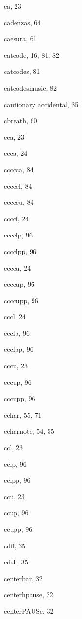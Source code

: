\begin{theindex}
  \item {\Bslash ca}, 23
  \item cadenzas, 64
  \item {\Bslash caesura}, 61
  \item {\Bslash catcode}, 16, 81, 82
  \item {\Bslash catcodes}, 81
  \item {\Bslash catcodesmusic}, 82
  \item cautionary accidental, 35
  \item {\Bslash cbreath}, 60
  \item {\Bslash cca}, 23
  \item {\Bslash ccca}, 24
  \item {\Bslash ccccca}, 84
  \item {\Bslash cccccl}, 84
  \item {\Bslash cccccu}, 84
  \item {\Bslash ccccl}, 24
  \item {\Bslash cccclp}, 96
  \item {\Bslash cccclpp}, 96
  \item {\Bslash ccccu}, 24
  \item {\Bslash ccccup}, 96
  \item {\Bslash ccccupp}, 96
  \item {\Bslash cccl}, 24
  \item {\Bslash ccclp}, 96
  \item {\Bslash ccclpp}, 96
  \item {\Bslash cccu}, 23
  \item {\Bslash cccup}, 96
  \item {\Bslash cccupp}, 96
  \item {\Bslash cchar}, 55, 71
  \item {\Bslash ccharnote}, 54, 55
  \item {\Bslash ccl}, 23
  \item {\Bslash cclp}, 96
  \item {\Bslash cclpp}, 96
  \item {\Bslash ccu}, 23
  \item {\Bslash ccup}, 96
  \item {\Bslash ccupp}, 96
  \item {\Bslash cdfl}, 35
  \item {\Bslash cdsh}, 35
  \item {\Bslash centerbar}, 32
  \item {\Bslash centerhpause}, 32
  \item {\Bslash centerPAUSe}, 32

\end{theindex}
